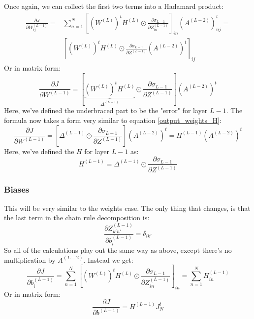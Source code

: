 \documentclass[12pt, a4paper]{article}
\numberwithin{equation}{section}
\begin{document}
Once again, we can collect the first two terms into a Hadamard product:
\begin{align}
\frac{\partial J}{\partial W^{(L-1)}_{ij}}=&\sum_{n=1}^N\left[\left(W^{(L)}\right)^t H^{(L)}\odot\frac{\partial\sigma_{L-1}}{\partial Z^{(L-1)}_{in}}\right]_{in}\left(A^{(L-2)}\right)^t_{nj}=\\
&\left[\left(W^{(L)}\right)^t H^{(L)}\odot\frac{\partial\sigma_{L-1}}{\partial Z^{(L-1)}}\left(A^{(L-2)}\right)^t\right]_{ij}
\end{align}
Or in matrix form:
\begin{equation}
\label{last_hidden_weights_matrix}
\frac{\partial J}{\partial W^{(L-1)}}=\left[\underbrace{\left(W^{(L)}\right)^t H^{(L)}}_{\Delta^{(L-1)}}\odot\frac{\partial\sigma_{L-1}}{\partial Z^{(L-1)}}\right]\left(A^{(L-2)}\right)^t
\end{equation}
Here, we've defined the underbraced part to be the "error" for layer $L-1$. The formula now takes a form very similar to equation \ref{output_weights_H}:
\begin{equation}
\frac{\partial J}{\partial W^{(L-1)}}=\left[\Delta^{(L-1)}\odot\frac{\partial\sigma_{L-1}}{\partial Z^{(L-1)}}\right]\left(A^{(L-2)}\right)^t=H^{(L-1)}\left(A^{(L-2)}\right)^t
\end{equation}
Here, we've defined the $H$ for layer $L-1$ as:
\begin{equation}
H^{(L-1)}=\Delta^{(L-1)}\odot\frac{\partial\sigma_{L-1}}{\partial Z^{(L-1)}}
\end{equation}

\subsubsection{Biases}
This will be very similar to the weights case. The only thing that changes, is that the last term in the chain rule decomposition is:
\begin{equation}
\frac{\partial Z^{(L-1)}_{k'n'}}{\partial b^{(L-1)}_i}=\delta_{ik'}
\end{equation}
So all of the calculations play out the same way as above, except there's no multiplication by $A^{(L-2)}$. Instead we get:
\begin{equation}
\frac{\partial J}{\partial b^{(L-1)}_i}=\sum_{n=1}^N\left[\left(W^{(L)}\right)^t H^{(L)}\odot\frac{\partial\sigma_{L-1}}{\partial Z^{(L-1)}_{in}}\right]_{in}=\sum_{n=1}^N H^{(L-1)}_{in}
\end{equation}
Or in matrix form:
\begin{equation}
\frac{\partial J}{\partial b^{(L-1)}}=H^{(L-1)}J^t_N
\end{equation}
\end{document}
